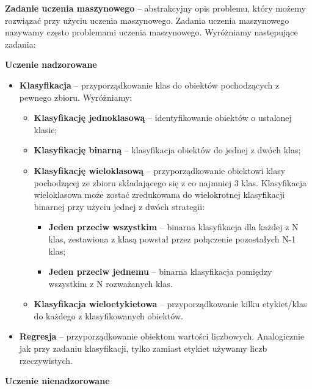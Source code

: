 \textbf{Zadanie  uczenia  maszynowego}  – abstrakcyjny opis problemu, który możemy rozwiązać przy użyciu uczenia maszynowego. Zadania  uczenia  maszynowego  nazywamy często problemami uczenia maszynowego. Wyróżniamy następujące zadania:\\

\centerline{\textbf{Uczenie nadzorowane}}

\begin{itemize}
	\item \textbf{Klasyfikacja} – przyporządkowanie klas do obiektów pochodzących z pewnego zbioru. Wyróżniamy:
	\begin{itemize}
		\item \textbf{Klasyfikację  jednoklasową} – identyfikowanie obiektów o ustalonej klasie;
		\item \textbf{Klasyfikację  binarną} – klasyfikacja obiektów do jednej z dwóch klas;
		\item \textbf{Klasyfikację  wieloklasową} – przyporządkowanie obiektowi klasy pochodzącej ze zbioru składającego się z co najmniej 3  klas. Klasyfikacja  wieloklasowa może zostać zredukowana do wielokrotnej klasyfikacji binarnej przy użyciu jednej z dwóch strategii:
		\begin{itemize}
			\item \textbf{Jeden  przeciw wszystkim} – binarna klasyfikacja dla każdej z N klas, zestawiona z klasą powstał przez połączenie pozostałych N-1 klas;
			\item \textbf{Jeden  przeciw  jednemu} – binarna klasyfikacja pomiędzy wszystkim z N rozważanych klas.
		\end{itemize}
		\item \textbf{Klasyfikacja  wieloetykietowa} – przyporządkowanie kilku etykiet/klas do każdego z klasyfikowanych obiektów.
	\end{itemize}
	\item \textbf{Regresja} – przyporządkowanie obiektom wartości liczbowych. Analogicznie jak przy zadaniu klasyfikacji, tylko zamiast etykiet używamy liczb rzeczywistych.
\end{itemize}

\centerline{\textbf{Uczenie nienadzorowane}}

